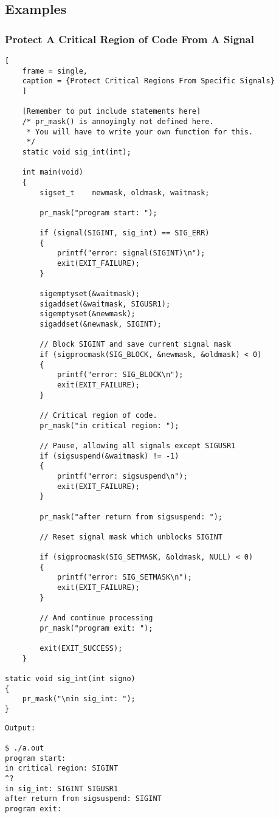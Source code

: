 \documentclass{article}
\begin{document}
\subsection{Examples}
\subsubsection{Protect A Critical Region of Code From A Signal}
\begin{lstlisting}[
    frame = single,
    caption = {Protect Critical Regions From Specific Signals}
    ]

    [Remember to put include statements here]
    /* pr_mask() is annoyingly not defined here.
     * You will have to write your own function for this.
     */
    static void sig_int(int);

    int main(void)
    {
        sigset_t    newmask, oldmask, waitmask;

        pr_mask("program start: ");

        if (signal(SIGINT, sig_int) == SIG_ERR)
        {
            printf("error: signal(SIGINT)\n");
            exit(EXIT_FAILURE);
        }

        sigemptyset(&waitmask);
        sigaddset(&waitmask, SIGUSR1);
        sigemptyset(&newmask);
        sigaddset(&newmask, SIGINT);

        // Block SIGINT and save current signal mask
        if (sigprocmask(SIG_BLOCK, &newmask, &oldmask) < 0)
        {
            printf("error: SIG_BLOCK\n");
            exit(EXIT_FAILURE);
        }

        // Critical region of code.
        pr_mask("in critical region: ");

        // Pause, allowing all signals except SIGUSR1
        if (sigsuspend(&waitmask) != -1)
        {
            printf("error: sigsuspend\n");
            exit(EXIT_FAILURE);
        }

        pr_mask("after return from sigsuspend: ");

        // Reset signal mask which unblocks SIGINT

        if (sigprocmask(SIG_SETMASK, &oldmask, NULL) < 0)
        {
            printf("error: SIG_SETMASK\n");
            exit(EXIT_FAILURE);
        }

        // And continue processing
        pr_mask("program exit: ");

        exit(EXIT_SUCCESS);
    }

static void sig_int(int signo)
{
    pr_mask("\nin sig_int: ");
}
\end{lstlisting}
\begin{verbatim}
Output:

$ ./a.out
program start:
in critical region: SIGINT
^?
in sig_int: SIGINT SIGUSR1
after return from sigsuspend: SIGINT
program exit:
\end{verbatim}
\end{document}
